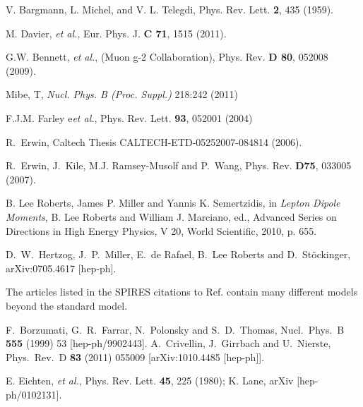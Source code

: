 \begin{thebibliography}{99}
 V. Bargmann, L.
Michel, and V. L. Telegdi, Phys. Rev. Lett. {\bf 2}, 435 (1959).

M. Davier, {\it et al.}, Eur. Phys. J. {\bf C 71}, 1515 (2011).

 G.W. Bennett, {\it et al.}, (Muon g-2 Collaboration),
 Phys. Rev. {\bf D 80}, 052008 (2009).




Mibe, T, \textit{Nucl. Phys. B (Proc. Suppl.)}
218:242 (2011)






  F.J.M. Farley e{\it et al.},
Phys. Rev. Lett. {\bf 93}, 052001 (2004)

 R.~Erwin,
Caltech Thesis CALTECH-ETD-05252007-084814 (2006).

 R.~Erwin, J.~Kile, M.J. Ramsey-Musolf and P.~Wang,
Phys. Rev. {\bf D75}, 033005 (2007).

 B. Lee Roberts, James P. Miller and Yannis
  K. Semertzidis, in {\it Lepton Dipole Moments}, B. Lee Roberts and William
  J. Marciano, ed., Advanced Series on Directions in High Energy Physics, V
  20, World Scientific, 2010, p. 655.



 D.~W.~Hertzog, J.~P.~Miller, E.~de Rafael, B.~Lee
Roberts and D.~St\"ockinger,
arXiv:0705.4617 [hep-ph]. %


  The articles listed in the
SPIRES citations to  Ref. \cite{Brown:2001mg} contain many different
models beyond the standard model.

  F.~Borzumati, G.~R.~Farrar, N.~Polonsky and S.~D.~Thomas,
  Nucl.\ Phys.\ B {\bf 555} (1999) 53
  [hep-ph/9902443].
  A.~Crivellin, J.~Girrbach and U.~Nierste,
  Phys.\ Rev.\ D {\bf 83} (2011) 055009
  [arXiv:1010.4485 [hep-ph]].

 E. Eichten, {\it et al.}, Phys. Rev. Lett. {\bf 45}, 225 (1980);
K. Lane, arXiv [hep-ph/0102131].


\end{thebibliography}
